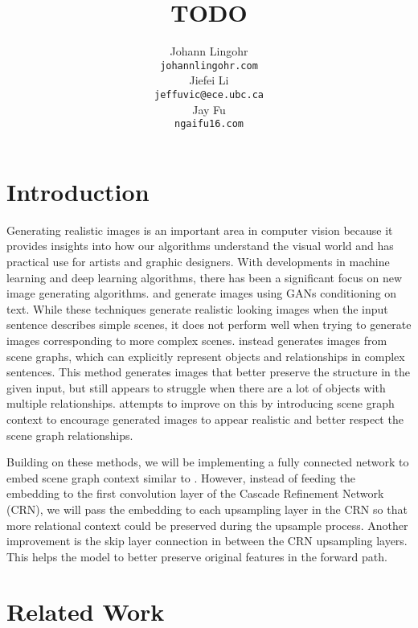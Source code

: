 \documentclass{article}
\title{TODO}
\author{%
  Johann Lingohr \\
  \texttt{johannlingohr\@gmail.com} \\
  \And
  Jiefei Li \\
  \texttt{jeffuvic@ece.ubc.ca} \\
  \And
  Jay Fu \\
  \texttt{ngaifu16\@gmail.com} \\
}
\begin{document}

\maketitle

\begin{abstract}

\end{abstract}

\section{Introduction}

Generating realistic images is an important area in computer vision because it provides insights into how our algorithms understand the visual world and has practical use for artists and graphic designers. With developments in machine learning and deep learning algorithms, there has been a significant focus on new image generating algorithms. \cite{t2im} and \cite{stackedgan} generate images using GANs conditioning on text. While these techniques generate realistic looking images when the input sentence describes simple scenes, it does not perform well when trying to generate images corresponding to more complex scenes. \cite{sg2im} instead generates images from scene graphs, which can explicitly represent objects and relationships in complex sentences. This method generates images that better preserve the structure in the given input, but still appears to struggle when there are a lot of objects with multiple relationships. \cite{sg2imgcontext} attempts to improve on this by introducing scene graph context to encourage generated images to appear realistic and better respect the scene graph relationships.

Building on these methods, we will be implementing a fully connected network to embed scene graph context similar to \cite{sg2imgcontext}. However, instead of feeding the embedding to the first convolution layer of the Cascade Refinement Network (CRN), we will pass the embedding to each upsampling layer in the CRN so that more relational context could be preserved during the upsample process. Another improvement is the skip layer connection in between the CRN upsampling layers. This helps the model to better preserve original features in the forward path. 

\section{Related Work}
\end{document}
